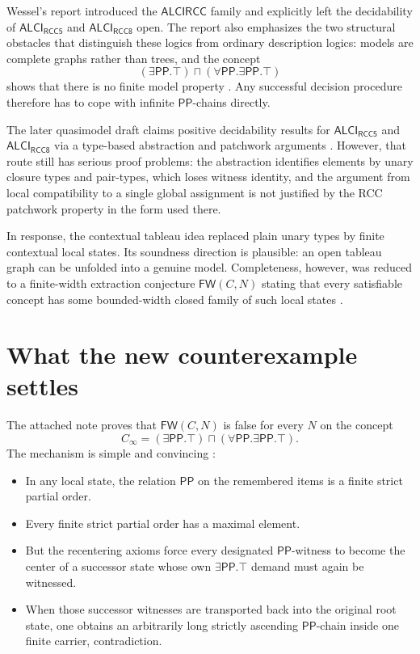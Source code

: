 \documentclass[11pt]{article}
\newcommand{\ALCIRCC}{\mathsf{ALCI}_{\mathsf{RCC5}}}
\newcommand{\Pp}{\mathsf{PP}}
\newcommand{\FW}{\mathsf{FW}}
\begin{document}
Wessel's report introduced the $\mathsf{ALCIRCC}$ family and explicitly left the decidability of $\ALCIRCC$ and $\mathsf{ALCI}_{\mathsf{RCC8}}$ open. The report also emphasizes the two structural obstacles that distinguish these logics from ordinary description logics: models are complete graphs rather than trees, and the concept
\[
(\exists \Pp.\top)\sqcap(\forall \Pp.\exists \Pp.\top)
\]
shows that there is no finite model property \cite[pp.~16--20, 48--50]{Wessel2003}. Any successful decision procedure therefore has to cope with infinite $\Pp$-chains directly.

The later quasimodel draft claims positive decidability results for $\ALCIRCC$ and $\mathsf{ALCI}_{\mathsf{RCC8}}$ via a type-based abstraction and patchwork arguments \cite{Claude2026Quasi}. However, that route still has serious proof problems: the abstraction identifies elements by unary closure types and pair-types, which loses witness identity, and the argument from local compatibility to a single global assignment is not justified by the RCC patchwork property in the form used there.

In response, the contextual tableau idea replaced plain unary types by finite contextual local states. Its soundness direction is plausible: an open tableau graph can be unfolded into a genuine model. Completeness, however, was reduced to a finite-width extraction conjecture $\FW(C,N)$ stating that every satisfiable concept has some bounded-width closed family of such local states \cite{GPT2026Tableau}.

\section{What the new counterexample settles}

The attached note proves that $\FW(C,N)$ is false for every $N$ on the concept
\[
C_\infty=(\exists \Pp.\top)\sqcap(\forall \Pp.\exists \Pp.\top).
\]
The mechanism is simple and convincing \cite{Claude2026FW}:
\begin{itemize}
\item In any local state, the relation $\Pp$ on the remembered items is a finite strict partial order.
\item Every finite strict partial order has a maximal element.
\item But the recentering axioms force every designated $\Pp$-witness to become the center of a successor state whose own $\exists\Pp.\top$ demand must again be witnessed.
\item When those successor witnesses are transported back into the original root state, one obtains an arbitrarily long strictly ascending $\Pp$-chain inside one finite carrier, contradiction.
\end{itemize}
\end{document}

